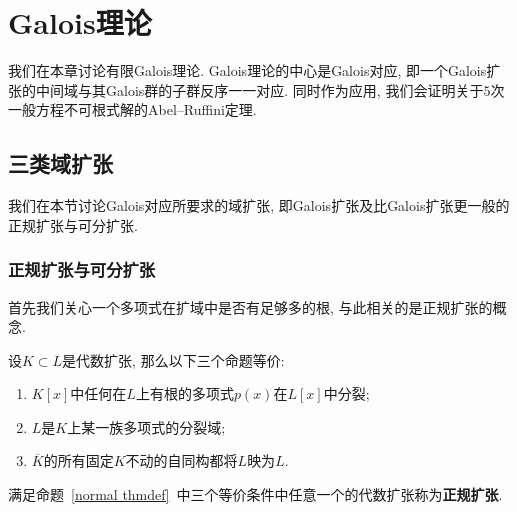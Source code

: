 \chapter{Galois理论}
我们在本章讨论有限Galois理论.
Galois理论的中心是Galois对应, 即一个Galois扩张的中间域与其Galois群的子群反序一一对应.
同时作为应用, 我们会证明关于$5$次一般方程不可根式解的Abel--Ruffini定理.

\section{三类域扩张}
我们在本节讨论Galois对应所要求的域扩张, 即Galois扩张及比Galois扩张更一般的正规扩张与可分扩张.

\subsection{正规扩张与可分扩张}

首先我们关心一个多项式在扩域中是否有足够多的根, 与此相关的是正规扩张的概念.

\begin{prop}\label{normal thmdef}
    设$K\subset L$是代数扩张, 那么以下三个命题等价:
    \begin{enumerate}[\rm (1)]
        \item $K[x]$中任何在$L$上有根的多项式$p(x)$在$L[x]$中分裂;
        \item $L$是$K$上某一族多项式的分裂域;
        \item $\overline{K}$的所有固定$K$不动的自同构都将$L$映为$L$.
    \end{enumerate}
\end{prop}

\begin{defn}
    满足命题~\ref{normal thmdef}~中三个等价条件中任意一个的代数扩张称为\textbf{正规扩张}.
\end{defn}

